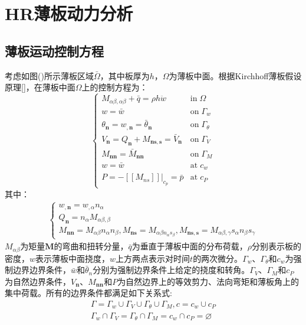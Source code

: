 \chapter{HR薄板动力分析}
\section{薄板运动控制方程}
考虑如图()所示薄板区域$\bar \Omega$，其中板厚为$h$，$\Omega$为薄板中面。根据Kirchhoff薄板假设原理[]，在薄板中面$\Omega$上的控制方程为：
\begin{equation}
    \begin{cases}
        M_{\alpha\beta,\alpha\beta}+\bar q=\rho h \ddot{w}&\mathrm{in} \; \Omega\\
        w=\bar w&\mathrm{on}\;\Gamma_w\\
        \theta_{\boldsymbol n}=w_{,\pmb n}=\bar \theta_{\boldsymbol n}&\mathrm{on}\;\Gamma_{\theta}\\
        V_{\pmb n}=Q_{\pmb n}+M_{\pmb{ns},\pmb s}=\bar V_{\pmb n}&\mathrm{on}\;\Gamma_V\\
        M_{\pmb{nn}}=\bar M_{\pmb{nn}}&\mathrm{on}\; \Gamma_M\\
        w=\bar w&\mathrm{at} \; c_w\\
        P=-[[M_{ns}]]\vert_{c_p}=\bar p&\mathrm{at}\; c_P
    \end{cases}
\end{equation}
其中：
\begin{equation}
\begin{split}
    \begin{cases}
    w_{,\pmb n}=w_{,\alpha}n_{\alpha}\\
Q_{\pmb n}=n_{\alpha}M_{\alpha\beta,\beta}\\
M_{\pmb{nn}}=M_{\alpha\beta}n_{\alpha}n_{\beta},M_{\pmb{ns}}=M_{\alpha\beta n_{\alpha}s_{\beta}},M_{\pmb{ns,s}}=M_{\alpha\beta,\gamma}s_{\alpha}n_{\beta}s_{\gamma}
    \end{cases}
\end{split}
\end{equation}
$M_{\alpha\beta}$为矩量$\boldsymbol M$的弯曲和扭转分量，$\bar q$为垂直于薄板中面的分布荷载，$\rho$分别表示板的密度，$w$表示薄板中面挠度，$w$上方两点表示对时间$t$的两次微分。$\Gamma_w$、$\Gamma_{\theta}$和$c_w$为强制边界边界条件，$\bar w$和$\bar \theta_n$分别为强制边界条件上给定的挠度和转角。$\Gamma_V$、$\Gamma_M$和$c_P$为自然边界条件，$V_{\boldsymbol n}$、$M_{\boldsymbol{nn}}$和$P$为自然边界上的等效剪力、法向弯矩和薄板角上的集中荷载。所有的边界条件都满足如下关系式:
\begin{equation}
    \begin{split}
        \Gamma=\Gamma_w\cup\Gamma_V\cup\Gamma_{\theta}\cup\Gamma_M,c=c_w\cup c_P\\
        \Gamma_w\cap\Gamma_V=\Gamma_{\theta}\cap\Gamma_M=c_w\cap c_P=\varnothing
    \end{split}
\end{equation}
